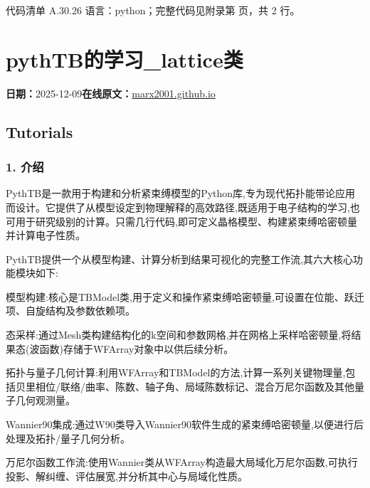 \documentclass[lang=cn,scheme=chinese,color=blue,device=normal,toc=onecol,math=cm]{elegantbook}
\begin{document}
\begin{codeindexbox}{代码清单 A.30.26}
语言：python；完整代码见附录第 \pageref{code:30:26} 页，共 2 行。
\end{codeindexbox}



\section{pythTB的学习\_\allowbreak{}lattice类}
\begin{articlemeta}
\textbf{日期：}2025-12-09\hfill\textbf{在线原文：}\href{https://marx2001.github.io/sci-note\_posts/20251209-PythonTB\_lattice}{marx2001.github.io}
\end{articlemeta}

\subsection{Tutorials}


\subsubsection{1. 介绍}


PythTB是一款用于构建和分析紧束缚模型的Python库,专为现代拓扑能带论应用而设计。它提供了从模型设定到物理解释的高效路径,既适用于电子结构的学习,也可用于研究级别的计算。只需几行代码,即可定义晶格模型、构建紧束缚哈密顿量并计算电子性质。\par


PythTB提供一个从模型构建、计算分析到结果可视化的完整工作流,其六大核心功能模块如下:\par


模型构建:核心是TBModel类,用于定义和操作紧束缚哈密顿量,可设置在位能、跃迁项、自旋结构及参数依赖项。\par


态采样:通过Mesh类构建结构化的k空间和参数网格,并在网格上采样哈密顿量,将结果态(波函数)存储于WFArray对象中以供后续分析。\par


拓扑与量子几何计算:利用WFArray和TBModel的方法,计算一系列关键物理量,包括贝里相位/\allowbreak{}联络/\allowbreak{}曲率、陈数、轴子角、局域陈数标记、混合万尼尔函数及其他量子几何观测量。\par


Wannier90集成:通过W90类导入Wannier90软件生成的紧束缚哈密顿量,以便进行后处理及拓扑/\allowbreak{}量子几何分析。\par


万尼尔函数工作流:使用Wannier类从WFArray构造最大局域化万尼尔函数,可执行投影、解纠缠、评估展宽,并分析其中心与局域化性质。\par
\end{document}
